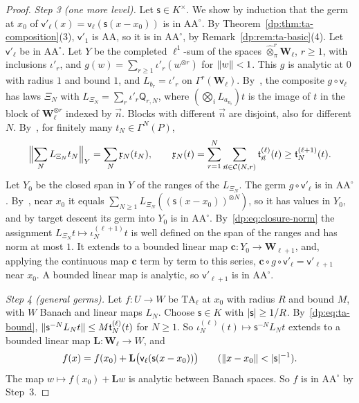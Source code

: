 \begin{proof}
\emph{Step 3 (one more level).} Let $\mathsf s\in K^\times$. We show by induction that the germ at $x_0$ of $\mathsf v'_\ell(x)=\mathsf v_\ell(\mathsf s(x-x_0))$ is in $\mathrm{AA}^\circ$. By Theorem~\ref{dp:thm:ta-composition}(3), $\mathsf v'_1$ is AA, so it is in $\mathrm{AA}^\circ$, by Remark~\ref{dp:rem:ta-basic}(4). Let $\mathsf v'_\ell$ be in $\mathrm{AA}^\circ$. Let $Y$ be the completed $\ell^1$-sum of the spaces $\widehat\otimes^r_\pi\mathbf W_\ell$, $r\ge1$, with inclusions $\iota'_r$, and $g(w)=\sum_{r\ge1}\iota'_r(w^{\otimes r})$ for $\lVert w\rVert<1$. This $g$ is analytic at $0$ with radius $1$ and bound $1$, and $L_{b_r}=\iota'_r$ on $\Gamma^r(\mathbf W_\ell)$. By~\cite[Lemma~Q.4]{I}, the composite $g\circ\mathsf v_\ell$ has laws $\Xi_N$ with $L_{\Xi_N}=\sum_r\iota'_r\mathsf Q_{r,N}$, where $(\bigotimes_iL_{a_{n_i}})t$ is the image of $t$ in the block of $\mathbf W_\ell^{\otimes r}$ indexed by $\vec n$. Blocks with different $\vec n$ are disjoint, also for different $N$. By~\cite[Lemma~Q.5(2),(1)]{I}, for finitely many $t_N\in\Gamma^N(P)$,
\begin{equation}\label{dp:eq:closure-norm}
 \Bigl\lVert\sum_NL_{\Xi_N}t_N\Bigr\rVert_Y=\sum_N\mathfrak x_N(t_N),\qquad
 \mathfrak x_N(t)=\sum_{r=1}^N\sum_{\vec n\in\mathcal C(N,r)}\mathfrak t^{(\ell)}_{\vec n}(t)\ge\mathfrak t^{(\ell+1)}_N(t).
\end{equation}
Let $Y_0$ be the closed span in $Y$ of the ranges of the $L_{\Xi_N}$. The germ $g\circ\mathsf v'_\ell$ is in $\mathrm{AA}^\circ$. By~\cite[Lemma~Q.3]{I}, near $x_0$ it equals $\sum_{N\ge1}L_{\Xi_N}((\mathsf s(x-x_0))^{\otimes N})$, so it has values in $Y_0$, and by target descent its germ into $Y_0$ is in $\mathrm{AA}^\circ$. By~\eqref{dp:eq:closure-norm} the assignment $L_{\Xi_N}t\mapsto\iota^{(\ell+1)}_Nt$ is well defined on the span of the ranges and has norm at most $1$. It extends to a bounded linear map $\mathbf c\colon Y_0\to\mathbf W_{\ell+1}$, and, applying the continuous map $\mathbf c$ term by term to this series, $\mathbf c\circ g\circ\mathsf v'_\ell=\mathsf v'_{\ell+1}$ near $x_0$. A bounded linear map is analytic, so $\mathsf v'_{\ell+1}$ is in $\mathrm{AA}^\circ$.

\emph{Step 4 (general germs).} Let $f\colon U\to W$ be $\mathrm{TA}_\ell$ at $x_0$ with radius $R$ and bound $M$, with $W$ Banach and linear maps $L_N$. Choose $\mathsf s\in K$ with $\lvert \mathsf s\rvert\ge1/R$. By~\eqref{dp:eq:ta-bound}, $\lVert \mathsf s^{-N}L_Nt\rVert\le M\mathfrak t^{(\ell)}_N(t)$ for $N\ge1$. So $\iota^{(\ell)}_N(t)\mapsto\mathsf s^{-N}L_Nt$ extends to a bounded linear map $\mathbf L\colon\mathbf W_\ell\to W$, and
\[
 f(x)=f(x_0)+\mathbf L\bigl(\mathsf v_\ell(\mathsf s(x-x_0))\bigr)\qquad(\lVert x-x_0\rVert<\lvert \mathsf s\rvert^{-1}).
\]
The map $w\mapsto f(x_0)+\mathbf Lw$ is analytic between Banach spaces. So $f$ is in $\mathrm{AA}^\circ$ by Step~3.
\end{proof}

